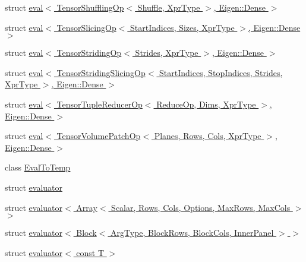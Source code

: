 \begin{DoxyCompactItemize}
\item 
struct \hyperlink{struct_eigen_1_1internal_1_1eval_3_01_tensor_shuffling_op_3_01_shuffle_00_01_xpr_type_01_4_00_01_eigen_1_1_dense_01_4}{eval$<$ Tensor\+Shuffling\+Op$<$ Shuffle, Xpr\+Type $>$, Eigen\+::\+Dense $>$}
\item 
struct \hyperlink{struct_eigen_1_1internal_1_1eval_3_01_tensor_slicing_op_3_01_start_indices_00_01_sizes_00_01_xpr0d382cdd518a43d65e8f154372eaddc8}{eval$<$ Tensor\+Slicing\+Op$<$ Start\+Indices, Sizes, Xpr\+Type $>$, Eigen\+::\+Dense $>$}
\item 
struct \hyperlink{struct_eigen_1_1internal_1_1eval_3_01_tensor_striding_op_3_01_strides_00_01_xpr_type_01_4_00_01_eigen_1_1_dense_01_4}{eval$<$ Tensor\+Striding\+Op$<$ Strides, Xpr\+Type $>$, Eigen\+::\+Dense $>$}
\item 
struct \hyperlink{struct_eigen_1_1internal_1_1eval_3_01_tensor_striding_slicing_op_3_01_start_indices_00_01_stop_i633f894d67a61646d554d84693f3012b}{eval$<$ Tensor\+Striding\+Slicing\+Op$<$ Start\+Indices, Stop\+Indices, Strides, Xpr\+Type $>$, Eigen\+::\+Dense $>$}
\item 
struct \hyperlink{struct_eigen_1_1internal_1_1eval_3_01_tensor_tuple_reducer_op_3_01_reduce_op_00_01_dims_00_01_xpfa3431995abe939b85159a164be4ee8a}{eval$<$ Tensor\+Tuple\+Reducer\+Op$<$ Reduce\+Op, Dims, Xpr\+Type $>$, Eigen\+::\+Dense $>$}
\item 
struct \hyperlink{struct_eigen_1_1internal_1_1eval_3_01_tensor_volume_patch_op_3_01_planes_00_01_rows_00_01_cols_0fbbbfea9d11ccf46d4c751aec1ba44e4}{eval$<$ Tensor\+Volume\+Patch\+Op$<$ Planes, Rows, Cols, Xpr\+Type $>$, Eigen\+::\+Dense $>$}
\item 
class \hyperlink{class_eigen_1_1internal_1_1_eval_to_temp}{Eval\+To\+Temp}
\item 
struct \hyperlink{struct_eigen_1_1internal_1_1evaluator}{evaluator}
\item 
struct \hyperlink{struct_eigen_1_1internal_1_1evaluator_3_01_array_3_01_scalar_00_01_rows_00_01_cols_00_01_options211222ab89c0f0e9e4e97c28137aec40}{evaluator$<$ Array$<$ Scalar, Rows, Cols, Options, Max\+Rows, Max\+Cols $>$ $>$}
\item 
struct \hyperlink{struct_eigen_1_1internal_1_1evaluator_3_01_block_3_01_arg_type_00_01_block_rows_00_01_block_cols_00_01_inner_panel_01_4_01_4}{evaluator$<$ Block$<$ Arg\+Type, Block\+Rows, Block\+Cols, Inner\+Panel $>$ $>$}
\item 
struct \hyperlink{struct_eigen_1_1internal_1_1evaluator_3_01const_01_t_01_4}{evaluator$<$ const T $>$}

\end{DoxyCompactItemize}

